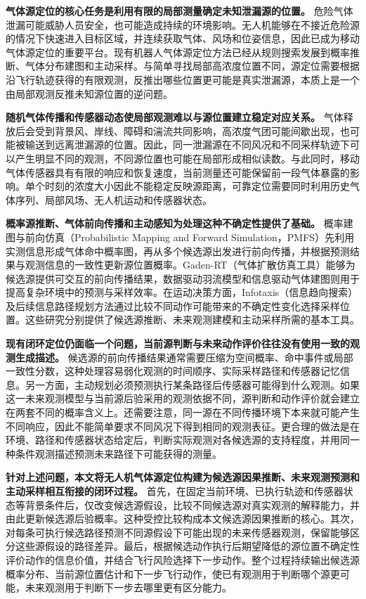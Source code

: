 \documentclass{aas}
\newcommand{\ccite}[1]{\nobreak\cite{#1}}
\begin{document}
{
\textbf{气体源定位的核心任务是利用有限的局部测量确定未知泄漏源的位置。}
危险气体泄漏可能威胁人员安全，也可能造成持续的环境影响。无人机能够在不接近危险源的情况下快速进入目标区域，并连续获取气体、风场和位姿信息，因此已成为移动气体源定位的重要平台\ccite{1,2}。现有机器人气体源定位方法已经从规则搜索发展到概率推断、气体分布建图和主动采样\ccite{1,17}。与简单寻找局部高浓度位置不同，源定位需要根据沿飞行轨迹获得的有限观测，反推出哪些位置更可能是真实泄漏源，本质上是一个由局部观测反推未知源位置的逆问题。

\textbf{随机气体传播和传感器动态使局部观测难以与源位置建立稳定对应关系。}
气体释放后会受到背景风、岸线、障碍和湍流共同影响，高浓度气团可能间歇出现，也可能被输送到远离泄漏源的位置\ccite{14,18}。因此，同一泄漏源在不同风况和不同采样轨迹下可以产生明显不同的观测，不同源位置也可能在局部形成相似读数。与此同时，移动气体传感器具有有限的响应和恢复速度，当前测量还可能保留前一段气体暴露的影响\ccite{5,15}。单个时刻的浓度大小因此不能稳定反映源距离，可靠定位需要同时利用历史气体序列、局部风场、无人机运动和传感器状态。

\textbf{概率源推断、气体前向传播和主动感知为处理这种不确定性提供了基础。}
概率建图与前向仿真（Probabilistic Mapping and Forward Simulation，PMFS）先利用实测信息形成气体命中概率图，再从多个候选源出发进行前向传播，并根据预测结果与观测信息的一致性更新源位置概率\ccite{3}。Gaden-RT（气体扩散仿真工具）能够为候选源提供可交互的前向传播结果\ccite{7}，数据驱动羽流模型和信息驱动气体建图则用于提高复杂环境中的预测与采样效率\ccite{8,9}。在运动决策方面，Infotaxis（信息趋向搜索）及后续信息路径规划方法通过比较不同动作可能带来的不确定性变化选择采样位置\ccite{6,32}。这些研究分别提供了候选源推断、未来观测建模和主动采样所需的基本工具。

\textbf{现有闭环定位仍面临一个问题，当前源判断与未来动作评价往往没有使用一致的观测生成描述。}
候选源的前向传播结果通常需要压缩为空间概率、命中事件或局部一致性分数，这种处理容易弱化观测的时间顺序、实际采样路径和传感器记忆信息。另一方面，主动规划必须预测执行某条路径后传感器可能得到什么观测。如果这一未来观测模型与当前源后验采用的观测依据不同，源判断和动作评价就会建立在两套不同的概率含义上。还需要注意，同一源在不同传播环境下本来就可能产生不同响应，因此不能简单要求不同风况下得到相同的观测表征。更合理的做法是在环境、路径和传感器状态给定后，判断实际观测对各候选源的支持程度，并用同一种条件观测描述预测未来路径下可能获得的测量。

\textbf{针对上述问题，本文将无人机气体源定位构建为候选源因果推断、未来观测预测和主动采样相互衔接的闭环过程。}
首先，在固定当前环境、已执行轨迹和传感器状态等背景条件后，仅改变候选源假设，比较不同候选源对真实观测的解释能力，并由此更新候选源后验概率。这种受控比较构成本文候选源因果推断的核心。其次，对每条可执行候选路径预测不同源假设下可能出现的未来传感器观测，保留能够区分这些源假设的路径差异。最后，根据候选动作执行后期望降低的源位置不确定性评价动作的信息价值，并结合飞行风险选择下一步动作。整个过程持续输出候选源概率分布、当前源位置估计和下一步飞行动作，使已有观测用于判断哪个源更可能，未来观测用于判断下一步去哪里更有区分能力。
}
\end{document}
